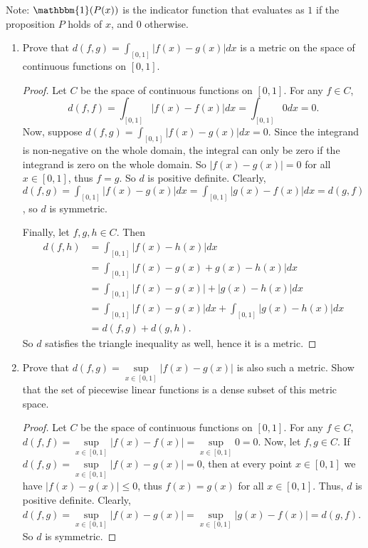 \documentclass[10pt]{article}
\newcommand{\Int}{{\displaystyle \int}}
\begin{document}
\noindent Note: $\mathbbm{1}(P(x))$ is the indicator function that evaluates as $1$ if the proposition $P$ holds of $x$, and 0 otherwise.

\begin{enumerate}

\item Prove that $d(f,g) = \Int_{[0,1]} |f(x) - g(x)| dx$ is a metric on the space of continuous functions on $[0,1]$.

\begin{proof}

Let $C$ be the space of continuous functions on $[0,1]$.  For any $f \in C$, $$d(f,f) = \Int_{[0,1]} |f(x) - f(x)| dx = \Int_{[0,1]} 0 dx = 0.$$  Now, suppose $d(f,g) = \Int_{[0,1]} |f(x) - g(x)| dx = 0$.  Since the integrand is non-negative on the whole domain, the integral can only be zero if the integrand is zero on the whole domain.  So $|f(x) - g(x)| = 0$ for all $x \in [0,1]$, thus $f = g$.  So $d$ is positive definite.  Clearly, $d(f,g) = \Int_{[0,1]} |f(x) - g(x)| dx = \Int_{[0,1]} |g(x) - f(x)| dx = d(g,f)$, so $d$ is symmetric.

Finally, let $f,g,h \in C$.  Then
\begin{align*}
d(f,h) &= \Int_{[0,1]} |f(x) - h(x)| dx \\
&= \Int_{[0,1]} |f(x) - g(x) + g(x) - h(x)| dx \\
&= \Int_{[0,1]} |f(x) - g(x)| + |g(x) - h(x)| dx \\
&= \Int_{[0,1]} |f(x) - g(x)|dx + \Int_{[0,1]}|g(x) - h(x)| dx \\
&= d(f,g) + d(g,h).
\end{align*}
So $d$ satisfies the triangle inequality as well, hence it is a metric.

\end{proof}

\item Prove that $d(f,g) = \sup\limits_{x \in [0,1]} |f(x) - g(x)|$ is also such a metric.  Show that the set of piecewise linear functions is a dense subset of this metric space.

\begin{proof}

Let $C$ be the space of continuous functions on $[0,1]$.  For any $f \in C$, $d(f,f) = \sup\limits_{x \in [0,1]} |f(x) - f(x)| = \sup\limits_{x \in [0,1]} 0 = 0$.  Now, let $f,g \in C$.  If $d(f,g) = \sup\limits_{x \in [0,1]} |f(x) - g(x)| = 0$, then at every point $x \in [0,1]$ we have $|f(x) - g(x)| \leq 0$, thus $f(x) = g(x)$ for all $x \in [0,1]$.  Thus, $d$ is positive definite.  Clearly, $d(f,g) = \sup\limits_{x \in [0,1]} |f(x) - g(x)| = \sup\limits_{x \in [0,1]} |g(x) - f(x)| = d(g,f)$.  So $d$ is symmetric.


\end{proof}
\end{enumerate}
\end{document}
